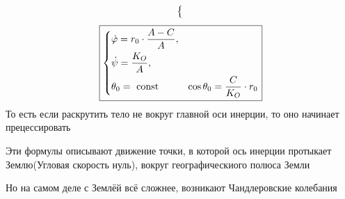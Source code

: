 \documentclass[crop=false]{standalone}
\begin{document}
\begin{enumerate}
\[\begin{dcases}
\begin{aligned}
        \end{aligned}
    \end{dcases}
    \]
    \[
    \boxed{
    \begin{dcases}
    \dot \varphi = r_0 \cdot \frac{A- C}{A}, \\
    \dot \psi = \frac{K_O}{A}, \\ 
    \theta_0 = \text{ const} & \cos \theta_0 = \frac{C}{K_O} \cdot r_0  \\
    \end{dcases}
    }
    \]
    То есть если раскрутить тело не вокруг главной оси инерции, то оно начинает прецессировать
    
    Эти формулы описывают движение точки, в которой ось инерции протыкает Землю(Угловая скорость нуль), вокруг географическиого полюса Земли

    Но на самом деле с Землёй всё сложнее, возникают Чандлеровские колебания
\end{enumerate}
\end{document}
